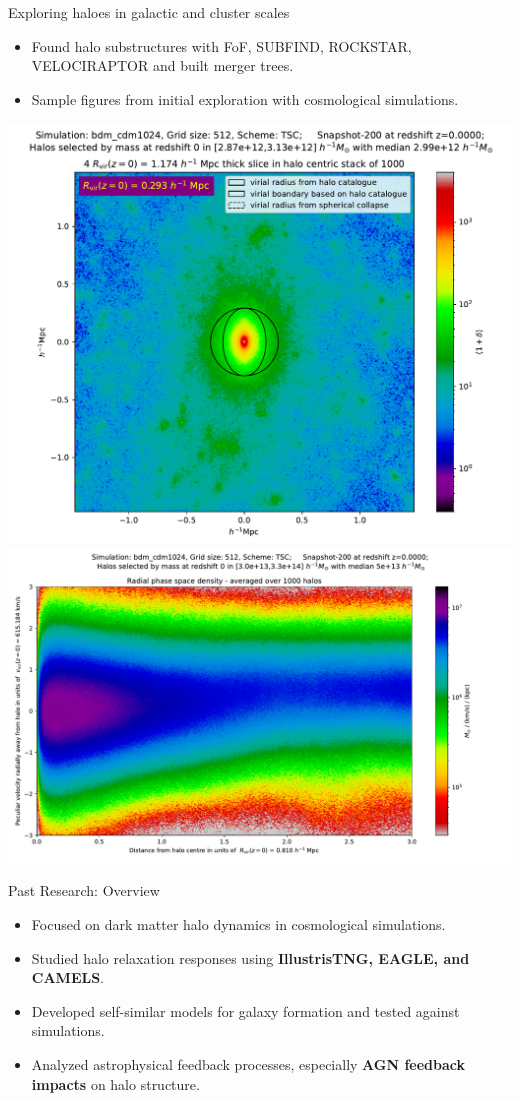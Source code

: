 \documentclass{beamer}
\begin{document}
\begin{frame}{Exploring haloes in galactic and cluster scales}
\begin{itemize}
    \item Found halo substructures with FoF, SUBFIND, ROCKSTAR, VELOCIRAPTOR and built merger trees.
    \item Sample figures from initial exploration with cosmological simulations.
\end{itemize}
    \includegraphics[width=0.485\linewidth]{figures/single_snapshot_200_1by8_3.0e+12_1000_light.pdf}
    \includegraphics[width=0.485\linewidth]{figures/phase_space_1D_200_1by8_1.0e+14_1000_light.pdf}
\end{frame}



\begin{frame}{Past Research: Overview}
    \begin{itemize}
        \item Focused on dark matter halo dynamics in cosmological simulations.
        \item Studied halo relaxation responses using \textbf{IllustrisTNG, EAGLE, and CAMELS}.
        \item Developed self-similar models for galaxy formation and tested against simulations.
        \item Analyzed astrophysical feedback processes, especially \textbf{AGN feedback impacts} on halo structure.
    \end{itemize}
\end{frame}
\end{document}
